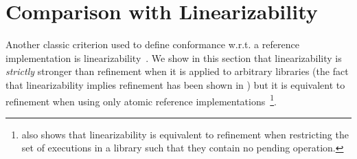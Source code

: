 \section{Comparison with Linearizability}
\label{sec:lin}


Another classic criterion used to define conformance w.r.t. a reference implementation is
linearizability~\cite{journals/toplas/HerlihyW90}. We show in this section that
linearizability is \emph{strictly} stronger than refinement when it is applied to arbitrary libraries 
(the fact that linearizability implies refinement has been shown in \citet{journals/tcs/FilipovicORY10})
but it is equivalent to
refinement when using only atomic reference implementations~\footnote{\citet{journals/tcs/FilipovicORY10}
also shows that linearizability is equivalent to refinement when restricting the set of executions in a library
such that they contain no pending operation.}.


